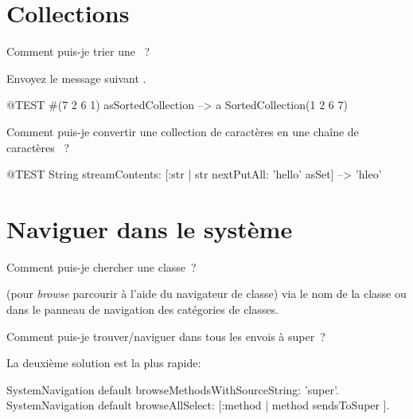 \documentclass[a4paper,10pt,twoside]{book}
\begin{document}
\section{Collections}

\begin{faq}
Comment puis-je trier une ~?

\end{faq}
\answer
Envoyez le message suivant .

\begin{code}{@TEST}
#(7 2 6 1) asSortedCollection --> a SortedCollection(1 2 6 7)
\end{code}

\begin{faq}
Comment puis-je convertir une collection de caract\`eres en une 
cha\^ine de caract\`eres
~?
\end{faq}
\answer
\begin{code}{@TEST}
String streamContents: [:str | str nextPutAll: 'hello' asSet] --> 'hleo'
\end{code}

\section{Naviguer dans le syst\`eme}

\begin{faq}
Comment puis-je chercher une classe~?
\end{faq}
\answer
 (pour \emph{browse} \cad parcourir \`a l'aide du navigateur de classe) via le nom de la classe ou  dans le panneau de navigation des cat\'egories de classes.

\begin{faq}
Comment puis-je trouver/naviguer dans tous les envois 
\`a
 super~?
\end{faq}
\answer
La deuxi\`eme solution est la plus rapide:
\begin{code}{}
SystemNavigation default browseMethodsWithSourceString: 'super'.
SystemNavigation default browseAllSelect: [:method | method sendsToSuper ].
\end{code}
\end{document}
